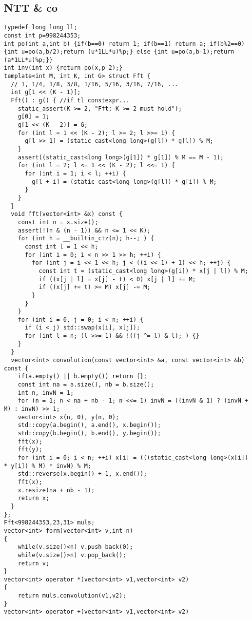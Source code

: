 \subsection{NTT \& co}
\begin{lstlisting}
typedef long long ll;
const int p=998244353;
int po(int a,int b) {if(b==0) return 1; if(b==1) return a; if(b%2==0) {int u=po(a,b/2);return (u*1LL*u)%p;} else {int u=po(a,b-1);return (a*1LL*u)%p;}}
int inv(int x) {return po(x,p-2);}
template<int M, int K, int G> struct Fft {
  // 1, 1/4, 1/8, 3/8, 1/16, 5/16, 3/16, 7/16, ...
  int g[1 << (K - 1)];
  Fft() : g() { //if tl constexpr...
    static_assert(K >= 2, "Fft: K >= 2 must hold");
    g[0] = 1;
    g[1 << (K - 2)] = G;
    for (int l = 1 << (K - 2); l >= 2; l >>= 1) {
      g[l >> 1] = (static_cast<long long>(g[l]) * g[l]) % M;
    }
    assert((static_cast<long long>(g[1]) * g[1]) % M == M - 1);
    for (int l = 2; l <= 1 << (K - 2); l <<= 1) {
      for (int i = 1; i < l; ++i) {
        g[l + i] = (static_cast<long long>(g[l]) * g[i]) % M;
      }
    }
  }
  void fft(vector<int> &x) const {
    const int n = x.size();
    assert(!(n & (n - 1)) && n <= 1 << K);
    for (int h = __builtin_ctz(n); h--; ) {
      const int l = 1 << h;
      for (int i = 0; i < n >> 1 >> h; ++i) {
        for (int j = i << 1 << h; j < ((i << 1) + 1) << h; ++j) {
          const int t = (static_cast<long long>(g[i]) * x[j | l]) % M;
          if ((x[j | l] = x[j] - t) < 0) x[j | l] += M;
          if ((x[j] += t) >= M) x[j] -= M;
        }
      }
    }
    for (int i = 0, j = 0; i < n; ++i) {
      if (i < j) std::swap(x[i], x[j]);
      for (int l = n; (l >>= 1) && !((j ^= l) & l); ) {}
    }
  }
  vector<int> convolution(const vector<int> &a, const vector<int> &b) const {
    if(a.empty() || b.empty()) return {};
    const int na = a.size(), nb = b.size();
    int n, invN = 1;
    for (n = 1; n < na + nb - 1; n <<= 1) invN = ((invN & 1) ? (invN + M) : invN) >> 1;
    vector<int> x(n, 0), y(n, 0);
    std::copy(a.begin(), a.end(), x.begin());
    std::copy(b.begin(), b.end(), y.begin());
    fft(x);
    fft(y);
    for (int i = 0; i < n; ++i) x[i] = (((static_cast<long long>(x[i]) * y[i]) % M) * invN) % M;
    std::reverse(x.begin() + 1, x.end());
    fft(x);
    x.resize(na + nb - 1);
    return x;
  }
};
Fft<998244353,23,31> muls;
vector<int> form(vector<int> v,int n)
{
    while(v.size()<n) v.push_back(0);
    while(v.size()>n) v.pop_back();
    return v;
}
vector<int> operator *(vector<int> v1,vector<int> v2)
{
    return muls.convolution(v1,v2);
}
vector<int> operator +(vector<int> v1,vector<int> v2)

\end{lstlisting}
